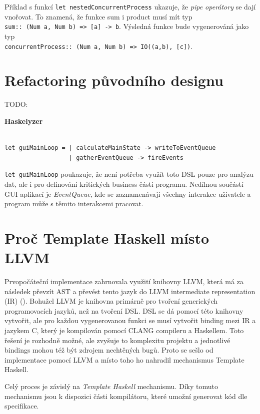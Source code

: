 \documentclass[male,czech]{kithesis}
\newcommand{\haskellInline}[1]{\colorbox{gray!10}{\texttt{#1}}}
\begin{document}
Příklad s funkcí \haskellInline{let nestedConcurrentProcess} ukazuje, 
že \textit{pipe operátory} se dají vnořovat. 
To znamená, 
že funkce sum i product musí mít typ \\
\haskellInline{sum:: (Num a, Num b) => [a] -> b}. 
Výsledná funkce bude vygenerováná jako typ \\
\haskellInline{concurrentProcess:: (Num a, Num b) => IO((a,b), [c])}.

\section{Refactoring původního designu}

TODO:

\textbf{Haskelyzer}
\begin{verbatim}

let guiMainLoop = | calculateMainState -> writeToEventQueue
                  | gatherEventQueue -> fireEvents

\end{verbatim}

\haskellInline{let guiMainLoop} poukazuje, 
že není potřeba využít toto DSL pouze pro analýzu dat, ale
i pro definování kritických business části programu. 
Nedílnou součástí GUI aplikací je \textit{EventQueue}, kde
se zaznamenávají všechny interakce uživatele a 
program může s těmito interakcemi pracovat.

\section{Proč Template Haskell místo LLVM}

Prvopočáteční implementace zahrnovala využití knihovny LLVM,
která má za následek převzít AST a 
převést tento jazyk do LLVM intermediate representation (IR)
(\cite{IntroToLLVM}).
Bohužel LLVM je knihovna primárně pro tvoření generických programovacích jazyků, 
než na tvoření DSL. 
DSL se dá pomocí této knihovny vytvořit, 
ale pro každou vygenerovanou funkci se musí vytvořit binding mezi IR a
jazykem C, 
který je kompilován pomocí CLANG compileru a Haskellem. 
Toto řešení je rozhodně možné, 
ale zvyšuje to komplexitu projektu a 
jednotlivé bindings mohou též být zdrojem nechtěných bugů. 
Proto se sešlo od implementace pomocí LLVM a
místo toho ho nahradil mechanismus Template Haskell.

Celý proces je závislý na \textit{Template Haskell} mechanismu. 
Díky tomuto mechanismu jsou k dispozici části kompilátoru, 
které umožní generovat kód dle specifikace.
\end{document}
